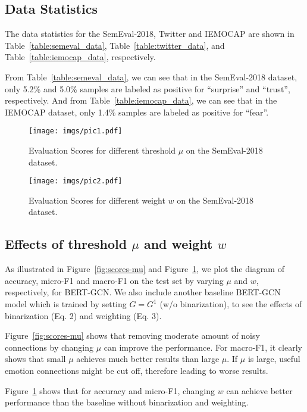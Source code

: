 \documentclass[11pt,a4paper]{article}
\begin{document}
\subsection{Data Statistics}
The data statistics for the SemEval-2018, Twitter and IEMOCAP are shown in Table~\ref{table:semeval_data}, Table~\ref{table:twitter_data}, and Table~\ref{table:iemocap_data}, respectively.

From Table~\ref{table:semeval_data}, we can see that in the SemEval-2018 dataset, only 5.2\% and 5.0\% samples are labeled as positive for ``surprise'' and ``trust'', respectively. And from Table~\ref{table:iemocap_data}, we can see that in the IEMOCAP dataset, only 1.4\% samples are labeled as positive for ``fear''.

\begin{figure}[t]
  \centering
\texttt{[image: imgs/pic1.pdf]}
  \caption{Evaluation Scores for different threshold $\mu$ on the SemEval-2018 dataset.}
  \label{fig:scores-mu}
  \centering
\texttt{[image: imgs/pic2.pdf]}  
  \caption{Evaluation Scores for different weight $w$ on the SemEval-2018 dataset.}
  \label{fig:scores-w}
\end{figure}

\subsection{Effects of threshold $\mu$ and weight $w$}
As illustrated in Figure~\ref{fig:scores-mu} and Figure~\ref{fig:scores-w}, we plot the diagram of accuracy, micro-F1 and macro-F1 on the test set by varying $\mu$ and $w$, respectively, for BERT-GCN. We also include another baseline BERT-GCN model which is trained by setting $G = G^1$ (w/o binarization), to see the effects of binarization (Eq. 2) and weighting (Eq. 3). 

Figure~\ref{fig:scores-mu} shows that removing moderate amount of noisy connections by changing $\mu$ can improve the performance. For macro-F1, it clearly shows that small $\mu$ achieves much better results than large $\mu$. If $\mu$ is large, useful emotion connections might be cut off, therefore leading to worse results.

Figure~\ref{fig:scores-w} shows that for accuracy and micro-F1, changing $w$ can achieve better performance than the baseline without binarization and weighting.
\end{document}
